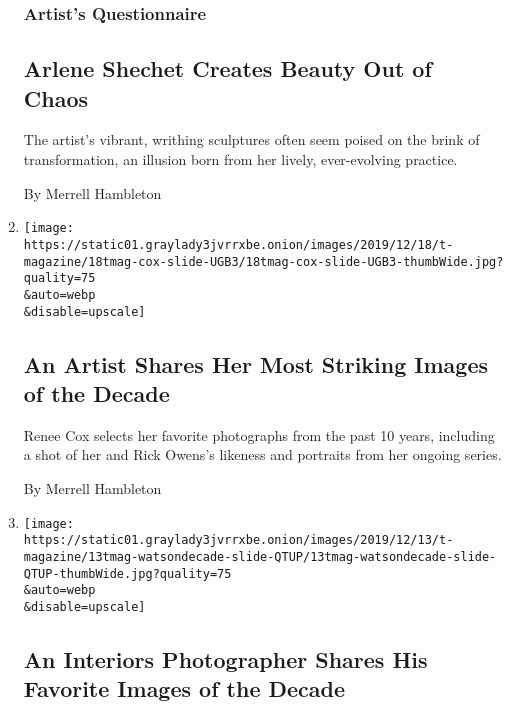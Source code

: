 \begin{enumerate}
  \hypertarget{artists-questionnaire}{%
  \subsubsection{Artist's Questionnaire}\label{artists-questionnaire}}

  \hypertarget{arlene-shechet-creates-beauty-out-of-chaos}{%
  \subsection{Arlene Shechet Creates Beauty Out of
  Chaos}\label{arlene-shechet-creates-beauty-out-of-chaos}}

  The artist's vibrant, writhing sculptures often seem poised on the
  brink of transformation, an illusion born from her lively,
  ever-evolving practice.

  By Merrell Hambleton
\item
  \href{/2019/12/23/t-magazine/renee-cox.html}{}

  \texttt{[image: https://static01.graylady3jvrrxbe.onion/images/2019/12/18/t-magazine/18tmag-cox-slide-UGB3/18tmag-cox-slide-UGB3-thumbWide.jpg?quality=75\\\&auto=webp\\\&disable=upscale]}

  \hypertarget{an-artist-shares-her-most-striking-images-of-the-decade}{%
  \subsection{An Artist Shares Her Most Striking Images of the
  Decade}\label{an-artist-shares-her-most-striking-images-of-the-decade}}

  Renee Cox selects her favorite photographs from the past 10 years,
  including a shot of her and Rick Owens's likeness and portraits from
  her ongoing series.

  By Merrell Hambleton
\item
  \href{/2019/12/13/t-magazine/decade-in-photos-simon-watson.html}{}

  \texttt{[image: https://static01.graylady3jvrrxbe.onion/images/2019/12/13/t-magazine/13tmag-watsondecade-slide-QTUP/13tmag-watsondecade-slide-QTUP-thumbWide.jpg?quality=75\\\&auto=webp\\\&disable=upscale]}

  \hypertarget{an-interiors-photographer-shares-his-favorite-images-of-the-decade}{%
  \subsection{An Interiors Photographer Shares His Favorite Images of
  the
  Decade}\label{an-interiors-photographer-shares-his-favorite-images-of-the-decade}}


\end{enumerate}
